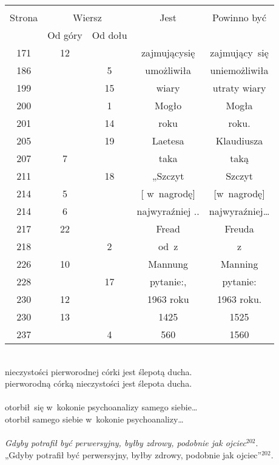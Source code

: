 \documentclass[a4paper,11pt]{article}
\begin{document}
\begin{center}
  \begin{tabular}{|c|c|c|c|c|}
    \hline
    & \multicolumn{2}{c|}{} & & \\
    Strona & \multicolumn{2}{c|}{Wiersz} & Jest
                              & Powinno być \\ \cline{2-3}
    & Od góry & Od dołu & & \\
    \hline
    171 & 12 & & zajmującysię & zajmujący~się \\
    186 & &  5 & umożliwiła & uniemożliwiła \\
    199 & & 15 & wiary & utraty wiary \\
    200 & &  1 & Mogło & Mogła \\
    201 & & 14 & roku & roku. \\
    205 & & 19 & Laetesa & Klaudiusza \\
    207 &  7 & & taka & taką \\
    211 & & 18 & „Szczyt & Szczyt \\
    214 &  5 & & [ w~nagrodę] & [w~nagrodę] \\
    214 &  6 & & najwyraźniej .. & najwyraźniej\ldots \\
    217 & 22 & & Fread & Freuda \\
    218 & &  2 & od~z & z \\
    226 & 10 & & Mannung & Manning \\
    228 & & 17 & pytanie:, & pytanie: \\
    230 & 12 & & 1963 roku & 1963 roku. \\
    230 & 13 & & 1425 & 1525 \\
    237 & &  4 & 560 & 1560 \\
    \hline
  \end{tabular}

\end{center}


\noindent
{} \\
\Jest nieczystości pierworodnej córki jest ślepotą ducha. \\
\Powin pierworodną córką nieczystości jest ślepota ducha. \\
 \\
\Jest otorbił~się w~kokonie psychoanalizy samego siebie\ldots \\
\Powin otorbił samego siebie w~kokonie psychoanalizy\ldots \\
 \\
\Jest \emph{Gdyby potrafił być perwersyjny, byłby zdrowy, podobnie jak
  ojciec$^{ 202 }$}. \\
\Powin „Gdyby potrafił być perwersyjny, byłby zdrowy,
podobnie jak ojciec”$^{ 202 }$. \\
\end{document}
